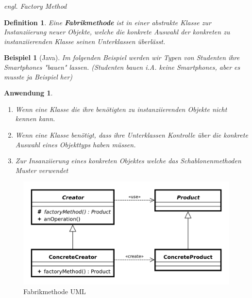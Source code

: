 \documentclass[a4paper]{article}
\theoremstyle{break}
\newtheorem{defi}{Definition}[section]
\newtheorem{ex}{Beispiel}[section]
\newtheorem{why}{Anwendung}[section]
\begin{document}
\textit{engl. Factory Method}

\begin{defi}
	Eine \textbf{Fabrikmethode} ist in einer abstrakte Klasse zur Instanziierung neuer Objekte, welche die konkrete Auswahl der konkreten zu instanziierenden Klasse seinen Unterklassen überlässt.
\end{defi}

\begin{ex}[Java]
	Im folgenden Beispiel werden wir Typen von Studenten ihre Smartphones "bauen" lassen. (Studenten bauen i.A. keine Smartphones, aber es musste ja Beispiel her)

	
	
	
	
	
	
	
\end{ex}

\begin{why}
	\begin{enumerate}
		\item 	Wenn eine Klasse die ihre benötigten zu instanziierenden Objekte nicht kennen kann.
		\item Wenn eine Klasse benötigt, dass ihre Unterklassen Kontrolle über die konkrete Auswahl eines Objekttyps haben müssen.
		\item Zur Insanziierung eines konkreten Objektes welche das Schablonenmethoden Muster verwendet
	\end{enumerate}
\end{why}
\begin{figure}[H]
	\centering
	\includegraphics[width=\textwidth]{../diagrams/uml/FactoryMethodPattern.png}
	\caption{Fabrikmethode UML}
\end{figure}
\end{document}
